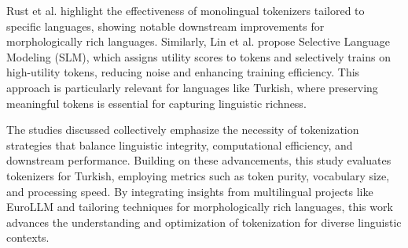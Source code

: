 Rust et al. \cite{rust_how_2021} highlight the effectiveness of monolingual tokenizers tailored to specific languages, showing notable downstream improvements for morphologically rich languages. Similarly, Lin et al. \cite{lin_not_nodate} propose Selective Language Modeling (SLM), which assigns utility scores to tokens and selectively trains on high-utility tokens, reducing noise and enhancing training efficiency. This approach is particularly relevant for languages like Turkish, where preserving meaningful tokens is essential for capturing linguistic richness.

The studies discussed collectively emphasize the necessity of tokenization strategies that balance linguistic integrity, computational efficiency, and downstream performance. Building on these advancements, this study evaluates tokenizers for Turkish, employing metrics such as token purity, vocabulary size, and processing speed. By integrating insights from multilingual projects like EuroLLM and tailoring techniques for morphologically rich languages, this work advances the understanding and optimization of tokenization for diverse linguistic contexts.